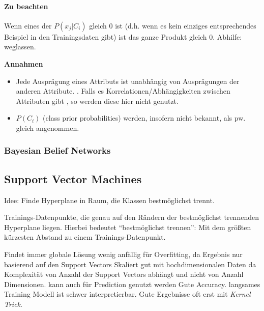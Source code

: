 \documentclass[10pt]{article} %
\begin{document}
\paragraph{Zu beachten}
\begin{cptitemize} 
   \item Wenn eines der $P(x_j|C_i)$ gleich 0 ist (d.h. wenn es kein einziges entsprechendes Beispiel in den Trainingsdaten gibt) ist das ganze Produkt gleich 0. Abhilfe: weglassen.
   \item \textbf{Annahmen}
     \begin{itemize}
     \item Jede Ausprägung eines Attributs ist unabhängig von Ausprägungen der
       anderen Attribute. . Falls es
       Korrelationen/Abhängigkeiten zwischen Attributen gibt , so werden diese hier nicht
       genutzt. 
       \item $P(C_i)$ (class prior probabilities) werden, insofern nicht
         bekannt, als pw. gleich angenommen.
     \end{itemize}
\end{cptitemize}  


\subsubsection{Bayesian Belief Networks}


\pagebreak
\subsection{Support Vector Machines}
Idee: Finde Hyperplane in Raum, die Klassen bestmöglichst trennt.

\begin{definition}
  Trainings-Datenpunkte, die genau auf den Rändern der bestmöglichst trennenden
  Hyperplane liegen. Hierbei bedeutet ``bestmöglichst trennen'': Mit dem größten
  kürzesten Abstand zu einem Trainings-Datenpunkt.
\end{definition}

\begin{cptitemize}
\advantageit Findet immer globale Lösung
\advantageit wenig anfällig für Overfitting, da Ergebnis nur basierend auf den
Support Vectors
\advantageit Skaliert gut mit hochdimensionalen Daten da Komplexität von Anzahl
der Support Vectors abhängt und nicht von Anzahl Dimensionen.
\advantageit kann auch für Prediction genutzt werden
\advantageit Gute Accuracy.
\disadvantageit langsames Training
\disadvantageit Modell ist schwer interpretierbar.
\disadvantageit Gute Ergebnisse oft erst mit \textit{Kernel Trick}.
\end{cptitemize}
\end{document}

